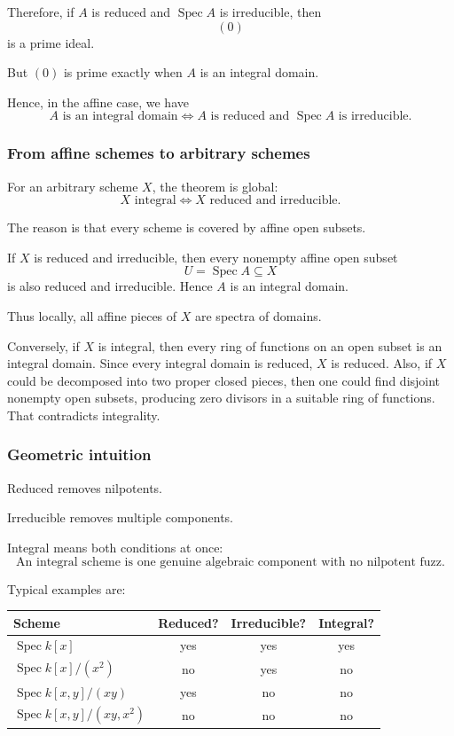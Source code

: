 \documentclass[12pt,a4paper]{article}
\DeclareMathOperator{\Spec}{Spec}
\providecommand{\Spec}{\operatorname{Spec}}
\theoremstyle{notespace}
\begin{document}
Therefore, if \(A\) is reduced and \(\Spec A\) is irreducible, then
\[
(0)
\]
is a prime ideal.

But \((0)\) is prime exactly when \(A\) is an integral domain.

Hence, in the affine case, we have
\[
\boxed{
	A\text{ is an integral domain}
	\iff
	A\text{ is reduced and }\Spec A\text{ is irreducible}.
}
\]

\subsubsection*{From affine schemes to arbitrary schemes}

For an arbitrary scheme \(X\), the theorem is global:
\[
X\text{ integral}
\iff
X\text{ reduced and irreducible}.
\]

The reason is that every scheme is covered by affine open subsets.

If \(X\) is reduced and irreducible, then every nonempty affine open subset
\[
U=\Spec A\subseteq X
\]
is also reduced and irreducible. Hence \(A\) is an integral domain.

Thus locally, all affine pieces of \(X\) are spectra of domains.

Conversely, if \(X\) is integral, then every ring of functions on an open subset is an integral domain. Since every integral domain is reduced, \(X\) is reduced. Also, if \(X\) could be decomposed into two proper closed pieces, then one could find disjoint nonempty open subsets, producing zero divisors in a suitable ring of functions. That contradicts integrality.

\subsubsection*{Geometric intuition}

Reduced removes nilpotents.

Irreducible removes multiple components.

Integral means both conditions at once:
\[
\boxed{
	\text{An integral scheme is one genuine algebraic component with no nilpotent fuzz.}
}
\]

Typical examples are:


\begin{center}
	\renewcommand{\arraystretch}{1.15}
	\setlength{\tabcolsep}{6pt}
	
	\begin{tabular}{lccc}
		\toprule
		\textbf{Scheme} & \textbf{Reduced?} & \textbf{Irreducible?} & \textbf{Integral?} \\
		\midrule
		\(\Spec k[x]\) & yes & yes & yes \\
		\(\Spec k[x]/(x^2)\) & no & yes & no \\
		\(\Spec k[x,y]/(xy)\) & yes & no & no \\
		\(\Spec k[x,y]/(xy,x^2)\) & no & no & no \\
		\bottomrule
	\end{tabular}
\end{center}
\end{document}
